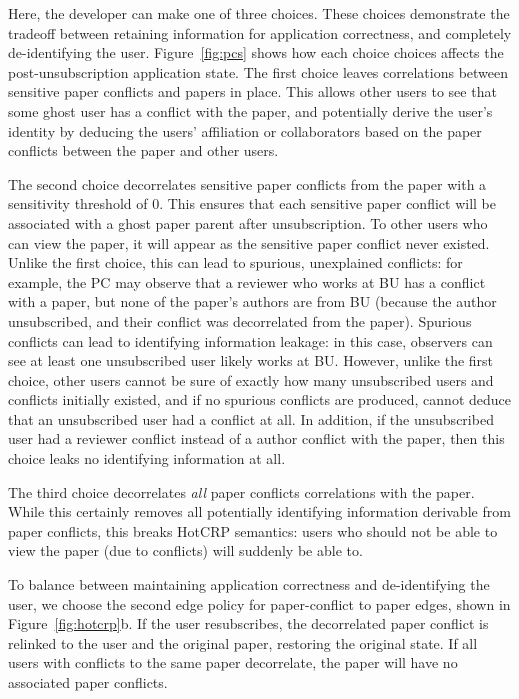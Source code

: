 Here, the developer can make one of three choices. These choices demonstrate the tradeoff between
retaining information for application correctness, and completely de-identifying the user.
Figure~\ref{fig:pcs} shows how each choice choices affects the post-unsubscription application state.
%
The first choice leaves correlations between sensitive paper conflicts and papers in place.
This allows other users to see that some ghost user has a conflict with the paper, and potentially
derive the user's identity by deducing the users' affiliation or collaborators based on the
paper conflicts between the paper and other users.

The second choice decorrelates sensitive paper conflicts from the paper with a sensitivity threshold
of 0. This ensures that each sensitive paper conflict will be associated with a ghost paper parent
after unsubscription. To other users who can view the paper, it will appear as the sensitive paper
conflict never existed. Unlike the first choice, this can lead to spurious, unexplained conflicts:
for example, the PC may observe that a reviewer who works at BU has a conflict with a paper, but
none of the paper's authors are from BU (because the author unsubscribed, and their conflict was
decorrelated from the paper). Spurious conflicts can lead to identifying information leakage: in
this case, observers can see at least one unsubscribed user likely works at BU. However, unlike the
first choice, other users cannot be sure of exactly how many unsubscribed users and conflicts
initially existed, and if no spurious conflicts are produced, cannot deduce that an unsubscribed
user had a conflict at all. In addition, if the unsubscribed user had a reviewer conflict instead of
a author conflict with the paper, then this choice leaks no identifying information at all.

The third choice decorrelates \emph{all} paper conflicts correlations with the paper. While this
certainly removes all potentially identifying information derivable from paper conflicts, this
breaks HotCRP semantics: users who should not be able to view the paper (due to conflicts) will
suddenly be able to.

To balance between maintaining application correctness and de-identifying the user, we choose the
second edge policy for paper-conflict to paper edges, shown in Figure~\ref{fig:hotcrp}b.
If the user resubscribes, the decorrelated paper conflict is relinked to the user and the original
paper, restoring the original state.  If all users with conflicts to the same paper decorrelate, the
paper will have no associated paper conflicts.

